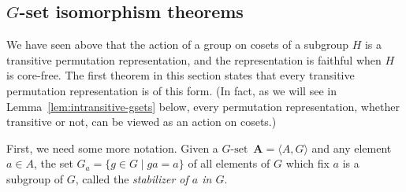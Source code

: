 \documentclass[cm,dissertation,actual,final]{uhthesis}
\theoremstyle{plain}
\theoremstyle{definition}
\theoremstyle{remark}
\numberwithin{theorem}{section}
\numberwithin{claim}{chapter}
\numberwithin{equation}{section}
\numberwithin{conjecture}{chapter}
\newcommand{\<}{\ensuremath{\langle}}
\renewcommand{\>}{\ensuremath{\rangle}}
\newcommand{\0}{\ensuremath{\mathbf{0}}}
\newcommand{\1}{\ensuremath{\mathbf{1}}}
\newcommand{\2}{\ensuremath{\mathbf{2}}}
\newcommand{\3}{\ensuremath{\mathbf{3}}}
\newcommand{\4}{\ensuremath{\mathbf{4}}}
\newcommand{\5}{\ensuremath{\mathbf{5}}}
\newcommand{\bA}{\ensuremath{\mathbf{A}}}
\newcommand{\Gset}{\ensuremath{G\text{-set}}}
\begin{document}
\subsection{$G$-set isomorphism theorems}
\label{subsec:g-set-isomorphism}
We have seen above that the action of a group on cosets of a subgroup $H$ is a
transitive permutation representation, and the representation is faithful when
$H$ is core-free. 
The first theorem in this section states that every
transitive permutation representation is of this form.
(In fact, as we will see in Lemma~\ref{lem:intransitive-gsets} below, every permutation
representation, whether transitive or not, can be viewed as an action on cosets.)

First, we need some more notation. Given a \Gset\ $\bA = \<A, G\>$ and any
element $a\in A$,  the set  
$G_a = \{g\in G \mid ga = a\}$ 
of all elements of $G$ which fix $a$ is a
subgroup of $G$, called the \emph{stabilizer of $a$ in $G$}.
\end{document}

